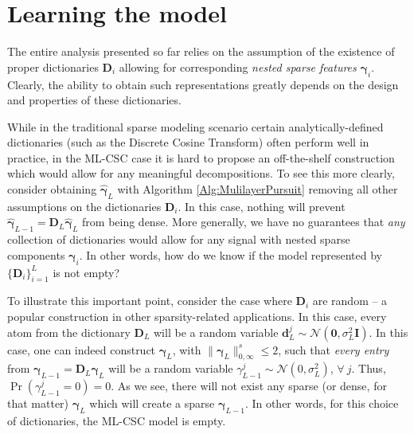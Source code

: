 \documentclass[10pt,journal]{IEEEtran}
\def\d{{\mathbf d}}
\def\D{{\mathbf D}}
\def\gama{{\boldsymbol \gamma}}
\theoremstyle{plain}
\theoremstyle{definition}
\begin{document}
\section{Learning the model}
\label{sec:Learning}
\label{sec:empty_models?}
The entire analysis presented so far relies on the assumption of the existence of proper dictionaries $\D_i$ allowing for corresponding \emph{nested sparse features} $\gama_i$. Clearly, the ability to obtain such representations greatly depends on the design and properties of these dictionaries. 

While in the traditional sparse modeling scenario certain analytically-defined dictionaries (such as the Discrete Cosine Transform) often perform well in practice, in the ML-CSC case it is hard to propose an off-the-shelf construction which would allow for any meaningful decompositions. To see this more clearly, consider obtaining $\hat{\gama}_L$ with Algorithm \ref{Alg:MulilayerPursuit} removing all other assumptions on the dictionaries $\D_i$. In this case, nothing will prevent $\hat{\gama}_{L-1} = \D_L\hat{\gama}_L$ from being dense. More generally, we have no guarantees that \emph{any} collection of dictionaries would allow for any signal with nested sparse components $\gama_i$. In other words, how do we know if the model represented by $\{\D_i\}_{i=1}^L$ is not empty?

To illustrate this important point, consider the case where $\D_i$ are random -- a popular construction in other sparsity-related applications. In this case, every atom from the dictionary $\D_L$ will be a random variable $\d_L^j \sim \mathcal{N}(\mathbf{0},\sigma^2_L\mathbf{I})$. In this case, one can indeed construct $\gama_L$, with $\|\gama_{L}\|^s_{0,\infty} \leq 2$, such that \emph{every entry} from $\gama_{L-1} = \D_L\gama_L$ will be a random variable $\gamma^j_{L-1}\sim \mathcal{N}(0,\sigma^2_L)$, $\forall\ j$. Thus, $\Pr\left(\gamma^j_{L-1}=0\right)=0$. As we see, there will not exist any sparse (or dense, for that matter) $\gama_L$ which will create a sparse $\gama_{L-1}$. In other words, for this choice of dictionaries, the ML-CSC model is empty.
\end{document}
